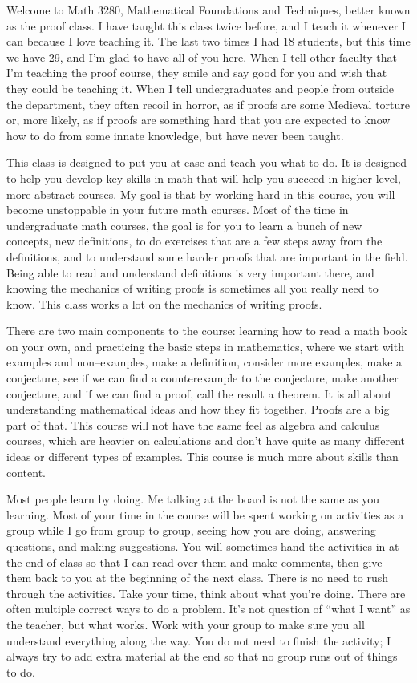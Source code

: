
Welcome to Math 3280, Mathematical Foundations and Techniques, better known as the proof class.
I have taught this class twice before, and I teach it whenever I can because I love teaching it.
The last two times I had 18 students, but this time we have 29, and I'm glad to have all of you here.
When I tell other faculty that I'm teaching the proof course, they smile and say good for you and wish that they could be teaching it.
When I tell undergraduates and people from outside the department, they often recoil in horror, as if proofs are some Medieval torture or, more likely, as if proofs are something hard that you are expected to know how to do from some innate knowledge, but have never been taught.
\vskip 0.1in

This class is designed to put you at ease and teach you what to do.
It is designed to help you develop key skills in math that will help you succeed in higher level, more abstract courses.
My goal is that by working hard in this course, you will become unstoppable in your future math courses.
Most of the time in undergraduate math courses, the goal is for you to learn a bunch of new concepts, new definitions, to do exercises that are a few steps away from the definitions, and to understand some harder proofs that are important in the field.
Being able to read and understand definitions is very important there, and knowing the mechanics of writing proofs is sometimes all you really need to know.
This class works a lot on the mechanics of writing proofs.
\vskip 0.1in

There are two main components to the course:  learning how to read a math book on your own, and practicing the basic steps in mathematics, where we start with examples and non--examples, make a definition, consider more examples, make a conjecture, see if we can find a counterexample to the conjecture, make another conjecture, and if we can find a proof, call the result a theorem.
It is all about understanding mathematical ideas and how they fit together.
Proofs are a big part of that.
This course will not have the same feel as algebra and calculus courses, which are heavier on calculations and don't have quite as many different ideas or different types of examples.
This course is much more about skills than content.
\vskip 0.1in

Most people learn by doing.
Me talking at the board is not the same as you learning.
Most of your time in the course will be spent working on activities as a group while I go from group to group, seeing how you are doing, answering questions, and making suggestions.
You will sometimes hand the activities in at the end of class so that I can read over them and make comments, then give them back to you at the beginning of the next class.
There is no need to rush through the activities.
Take your time, think about what you're doing.
There are often multiple correct ways to do a problem.
It's not question of ``what I want'' as the teacher, but what works.
Work with your group to make sure you all understand everything along the way.
You do not need to finish the activity; I always try to add extra material at the end so that no group runs out of things to do.
\vskip 0.1in

